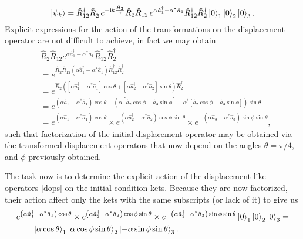 \documentclass{article}
\newcommand{\mi}{\mathrm{i}}
\newcommand{\op}[1]{\hat{#1}}
\begin{document}
\begin{equation}\label{initcond}
    \ket{\psi_{k}}=\op{R}_{12}^{\dagger}\op{R}_{2}^{\dagger}\,e^{-\mi k\frac{\op{H}_2}{\gamma}}\op{R}_{2}\op{R}_{12}\,e^{\alpha \op{a}_{1}^{\dagger}-\alpha^{*}\op{a}_{1}}\op{R}_{12}^{\dagger}\op{R}_{2}^{\dagger}\ket{0}_{1}\ket{0}_{2}\ket{0}_{3}.
\end{equation}
Explicit expressions for the action of the transformations on the displacement operator are not difficult to achieve, in fact we may obtain
\begin{equation}\label{dops}
\begin{aligned}
    &\op{R}_{2}\op{R}_{12}e^{\alpha\op{a}_{1}^{\dagger} - \alpha^{*} \op{a}_{1}} \op{R}_{12}^{\dagger}\op{R}_{2}^{\dagger}\\ &= e^{\op{R}_{2}\op{R}_{12}\left(\alpha \op{a}_{1}^{\dagger} - \alpha^{*} \op{a}_{1}\right)\op{R}_{12}^{\dagger}\op{R}_{2}^{\dagger}}\\
    &= e^{\op{R}_{2}\left(\left[\alpha \op{a}_{1}^{\dagger} - \alpha^{*}\op{a}_{1}\right]\cos\theta +\left[\alpha \op{a}_{2}^{\dagger} - \alpha^{*}\op{a}_{2}\right]\sin\theta \right)\op{R}_{2}^{\dagger}}\\
    &= e^{\left(\alpha \op{a}_{1}^{\dagger} - \alpha^{*}\op{a}_{1}\right)\cos\theta + \left(\alpha\left[\op{a}_{2}^{\dagger}\cos\phi - \op{a}_{3}^{\dagger}\sin\phi\right] - \alpha^{*}\left[\op{a}_{2}\cos\phi - \op{a}_{3}\sin\phi\right]\right)\sin\theta}\\
    &= e^{\left(\alpha \op{a}_{1}^{\dagger} - \alpha^{*} \op{a}_{1}\right)\cos\theta}\times e^{\left(\alpha \op{a}_{2}^{\dagger} - \alpha^{*} \op{a}_{2}\right)\cos\phi\sin\theta}\times e^{-\left(\alpha \op{a}_{3}^{\dagger} - \alpha^{*} \op{a}_{3}\right)\sin\phi\sin\theta},
\end{aligned}
\end{equation}
such that factorization of the initial displacement operator may be obtained via the transformed displacement operators that now depend on the angles $\theta=\pi/4$, and $\phi$ previously obtained.

The task now is to determine the explicit action of the displacement-like operators \eqref{dops} on the initial condition kets. Because they are now factorized, their action affect only the kets with the same subscripts (or lack of it) to give us
\begin{equation}\label{ticond}
\begin{aligned}
    &e^{\left(\alpha \op{a}_{1}^{\dagger} - \alpha^{*} \op{a}_{1}\right)\cos\theta}\times e^{\left(\alpha \op{a}_{2}^{\dagger} - \alpha^{*} \op{a}_{2}\right)\cos\phi\sin\theta}\times e^{-\left(\alpha \op{a}_{3}^{\dagger} - \alpha^{*} \op{a}_{3}\right)\sin\phi\sin\theta}\ket{0}_{1}\ket{0}_{2}\ket{0}_{3} =\\
    &\qquad \ket{\alpha\cos\theta}_{1}\ket{\alpha\cos\phi\sin\theta}_{2}\ket{-\alpha\sin\phi\sin\theta}_{3}.
\end{aligned}
\end{equation}
\end{document}
